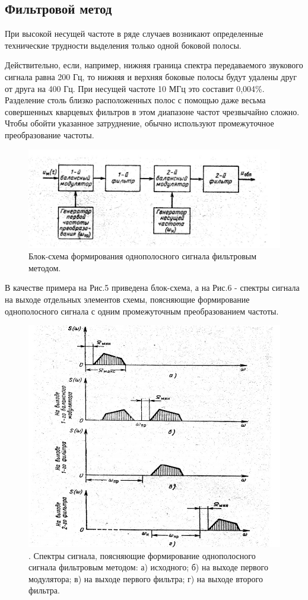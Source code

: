 \subsection{Фильтровой метод}

При высокой несущей частоте в ряде случаев возникают определенные технические трудности выделения только одной боковой полосы.

Действительно, если, например, нижняя граница спектра передаваемого звукового сигнала равна 200 Гц, то нижняя и верхняя боковые полосы будут удалены друг от друга на 400 Гц. При несущей частоте 10 МГц это составит 0,004\%. Разделение столь близко расположенных полос с помощью даже весьма совершенных кварцевых фильтров в этом диапазоне частот чрезвычайно сложно. Чтобы обойти указанное затруднение, обычно используют промежуточное преобразование частоты. 

\begin{figure}[h!]
	\centering
	\includegraphics[width=0.8\linewidth]{fig/fig5}
	\caption{ Блок-схема формирования однополосного сигнала фильтровым методом.}
	\label{fig:fig5}
\end{figure}

В качестве примера на Рис.5 приведена блок-схема, а на Рис.6 - спектры сигнала на выходе отдельных элементов схемы, поясняющие формирование однополосного сигнала с одним
промежуточным преобразованием частоты.

\begin{figure}[h!]
	\centering
	\includegraphics[scale=1.5]{fig/fig6}
	\caption{. Спектры сигнала, поясняющие формирование однополосного сигнала
фильтровым методом: а) исходного; б) на выходе первого модулятора; в) на
выходе первого фильтра; г) на выходе второго фильтра.}
	\label{fig:fig6}
\end{figure}

